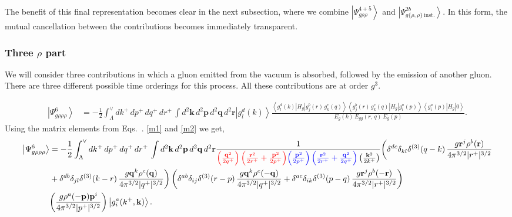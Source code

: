 \documentclass[aps,prd,amsmath,amssymb,nofootinbib]{revtex4-2}
\numberwithin{equation}{section}
\begin{document}
The benefit of this final representation becomes clear in the next subsection, where we combine $\left|\Psi_{g\rho\rho}^{4+5}\right\rangle$ and $\left|\Psi_{g\{\rho,\rho\}\:\text{inst.}}^{2b}\right\rangle$. In this form, the mutual cancellation between the contributions becomes immediately transparent.
\subsubsection{Three $\rho$ part}
We will consider three contributions in which a gluon emitted from the vacuum is absorbed, followed by the emission of another gluon. There are three different possible time orderings for this process. All these contributions are at order $g^{3}$. 
\begin{figure}[h]
    \label{fig:1}
\end{figure}
\begin{figure}[h]
    \label{fig:2} 
\end{figure}
\begin{align}\label{3rho}
 \left|\Psi_{g\rho\rho\rho}^{6}\right\rangle  & = -\frac{1}{2}\int_{\Lambda}^{\vee}dk^{+}\, dp^{+}\, dq^{+}\, dr^{+}\,\int d^{2}\mathbf{k}\, d^{2}\mathbf{p}\, d^{2}\mathbf{q}\, d^{2}\mathbf{r}\left|g_{l}^{d}(k)\right\rangle \frac{\left\langle g_{l}^{d}(k)\left|H_{g}\right|g_{j}^{b}(r)\, g_{k}^{c}(q)\right\rangle \left\langle g_{j}^{b}(r)\, g_{k}^{c}(q)\left|H_{g}\right|g_{i}^{a}(p)\right\rangle \left\langle g_{i}^{a}(p)\left|H_{g}\right|0\right\rangle }{E_{g}(k)\, E_{gg}(r,\, q)\, E_{g}(p)}.
\end{align}
Using the matrix elements from Eqs.~. \eqref{m1} and \eqref{m2} we get,
\begin{align}\label{stseve}
\left|\Psi_{g\rho\rho\rho}^{6}\right\rangle & =-\frac{1}{2}\int_{\Lambda}^{\vee}dk^{+}\, dp^{+}\, dq^{+}\, dr^{+}\,\int d^{2}\mathbf{k}\, d^{2}\mathbf{p}\, d^{2}\mathbf{q}\, d^{2}\mathbf{r}\frac{1}{\textcolor{red}{\left(\frac{\mathbf{q}^{2}}{2q^{+}}\right)\left(\frac{\mathbf{r}^{2}}{2r^{+}}+\frac{\mathbf{p}^{2}}{2p^{+}}\right)}\textcolor{blue}{\left(\frac{\mathbf{p}^{2}}{2p^{+}}\right)\left(\frac{\mathbf{r}^{2}}{2r^{+}}+\frac{\mathbf{q}^{2}}{2q^{+}}\right)}\left(\frac{\mathbf{k}^{2}}{2k^{+}}\right)}\bigg(\delta^{dc}\delta_{kl}\delta^{(3)}(q-k)\,\frac{g\mathbf{r}^{j}\rho^{b}(\mathbf{r})}{4\pi^{3/2}|r^{+}|^{3/2}}\notag \\ & +\delta^{db}\delta_{jl}\delta^{(3)}(k-r)\,\frac{g\mathbf{q}^{k}\rho^{c}(\mathbf{q})}{4\pi^{3/2}|q^{+}|^{3/2}}\bigg)\left(\delta^{ab}\delta_{ij}\delta^{(3)}(r-p)\,\frac{g\mathbf{q}^{k}\rho^{c}(-\mathbf{q})}{4\pi^{3/2}|q^{+}|^{3/2}}+\delta^{ac}\delta_{ik}\delta^{(3)}(p-q)\,\frac{g\mathbf{r}^{j}\rho^{b}(-\mathbf{r})}{4\pi^{3/2}|r^{+}|^{3/2}}\right)\notag \\ & \bigg(\frac{g\rho^{a}(-\mathbf{p})\mathbf{p}^{i}}{4\pi^{3/2}|p^{+}|^{3/2}}\bigg)\left|g_{i}^{a}(k^{+},\mathbf{k})\right\rangle.
\end{align}
\end{document}
